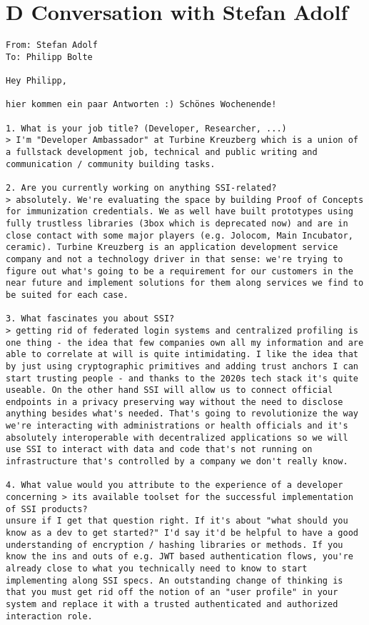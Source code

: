 \section*{D Conversation with Stefan Adolf}\label{appendix: x}
\begin{Verbatim}[breaklines=true, breaksymbol={}, breaksymbolsepleftnchars=2]
From: Stefan Adolf
To: Philipp Bolte

Hey Philipp,

hier kommen ein paar Antworten :) Schönes Wochenende!

1. What is your job title? (Developer, Researcher, ...)
> I'm "Developer Ambassador" at Turbine Kreuzberg which is a union of a fullstack development job, technical and public writing and communication / community building tasks.

2. Are you currently working on anything SSI-related?
> absolutely. We're evaluating the space by building Proof of Concepts for immunization credentials. We as well have built prototypes using fully trustless libraries (3box which is deprecated now) and are in close contact with some major players (e.g. Jolocom, Main Incubator, ceramic). Turbine Kreuzberg is an application development service company and not a technology driver in that sense: we're trying to figure out what's going to be a requirement for our customers in the near future and implement solutions for them along services we find to be suited for each case.

3. What fascinates you about SSI?
> getting rid of federated login systems and centralized profiling is one thing - the idea that few companies own all my information and are able to correlate at will is quite intimidating. I like the idea that by just using cryptographic primitives and adding trust anchors I can start trusting people - and thanks to the 2020s tech stack it's quite useable. On the other hand SSI will allow us to connect official endpoints in a privacy preserving way without the need to disclose anything besides what's needed. That's going to revolutionize the way we're interacting with administrations or health officials and it's absolutely interoperable with decentralized applications so we will use SSI to interact with data and code that's not running on infrastructure that's controlled by a company we don't really know.

4. What value would you attribute to the experience of a developer concerning > its available toolset for the successful implementation of SSI products?
unsure if I get that question right. If it's about "what should you know as a dev to get started?" I'd say it'd be helpful to have a good understanding of encryption / hashing libraries or methods. If you know the ins and outs of e.g. JWT based authentication flows, you're already close to what you technically need to know to start implementing along SSI specs. An outstanding change of thinking is that you must get rid off the notion of an "user profile" in your system and replace it with a trusted authenticated and authorized interaction role.


\end{Verbatim}
